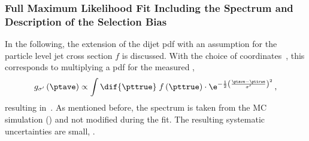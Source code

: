 \subsubsection{Full Maximum Likelihood Fit Including the Spectrum and Description of the Selection Bias}\label{sec:ResFit:DataDriven:FullFit}

In the following, the extension of the dijet pdf with an assumption for the particle level jet \pt cross section $f$ is discussed.
With the choice of coordinates~, this corresponds to multiplying a pdf for the measured \ptave,
\begin{equation*}
 g_{\sigma'}\left(\ptave\right) \propto
  \int\dif{\pttrue}\;f\left(\pttrue\right)\cdot
  \e^{-\frac{1}{2}\left(\frac{\ptave - \pttrue}{\sigma'}\right)^{2}} \, , 
\end{equation*}
resulting in~.
As mentioned before, the spectrum is taken from the MC simulation () and not modified during the fit.
The resulting systematic uncertainties are small, .

